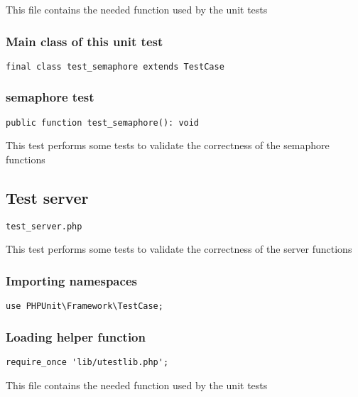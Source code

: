 \documentclass[a4paper]{article}
\begin{document}
This file contains the needed function used by the unit tests

\hypertarget{toc326}{}
\subsubsection{Main class of this unit test}

\begin{lstlisting}
final class test_semaphore extends TestCase
\end{lstlisting}

\hypertarget{toc327}{}
\subsubsection{semaphore test}

\begin{lstlisting}
public function test_semaphore(): void
\end{lstlisting}

This test performs some tests to validate the correctness
of the semaphore functions

\hypertarget{toc328}{}
\subsection{Test server}

\begin{lstlisting}
test_server.php
\end{lstlisting}

This test performs some tests to validate the correctness
of the server functions

\hypertarget{toc329}{}
\subsubsection{Importing namespaces}

\begin{lstlisting}
use PHPUnit\Framework\TestCase;
\end{lstlisting}

\hypertarget{toc330}{}
\subsubsection{Loading helper function}

\begin{lstlisting}
require_once 'lib/utestlib.php';
\end{lstlisting}

This file contains the needed function used by the unit tests
\end{document}
